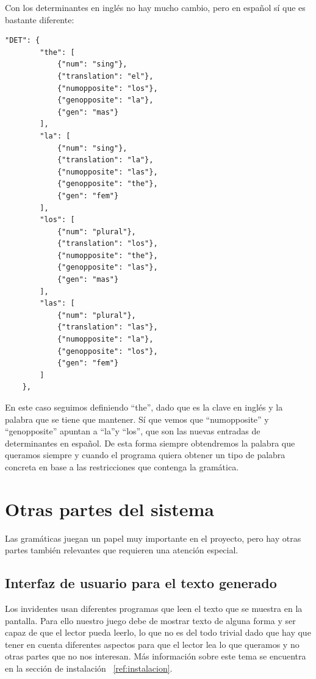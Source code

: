 Con los determinantes en inglés no hay mucho cambio, pero en español sí que es bastante diferente:

\begin{lstlisting}[style=json]
"DET": {
        "the": [
            {"num": "sing"},
            {"translation": "el"},
            {"numopposite": "los"},
            {"genopposite": "la"},
            {"gen": "mas"}
        ],
        "la": [
            {"num": "sing"},
            {"translation": "la"},
            {"numopposite": "las"},
            {"genopposite": "the"},
            {"gen": "fem"}
        ],
        "los": [
            {"num": "plural"},
            {"translation": "los"},
            {"numopposite": "the"},
            {"genopposite": "las"},
            {"gen": "mas"}
        ],
        "las": [
            {"num": "plural"},
            {"translation": "las"},
            {"numopposite": "la"},
            {"genopposite": "los"},
            {"gen": "fem"}
        ]
    },
\end{lstlisting}

En este caso seguimos definiendo ``the'', dado que es la clave en inglés y la palabra que se tiene que mantener. Sí que vemos que ``numopposite'' y ``genopposite'' apuntan a ``la''y ``los'', que son las nuevas entradas de determinantes en español. De esta forma siempre obtendremos la palabra que queramos siempre y cuando el programa quiera obtener un tipo de palabra concreta en base a las restricciones que contenga la gramática.

\section{Otras partes del sistema}

Las gramáticas juegan un papel muy importante en el proyecto, pero hay otras partes también relevantes que requieren una atención especial.

\subsection{Interfaz de usuario para el texto generado}

Los invidentes usan diferentes programas que leen el texto que se muestra en la pantalla. Para ello nuestro juego debe de mostrar texto de alguna forma y ser capaz de que el lector pueda leerlo, lo que no es del todo trivial dado que hay que tener en cuenta diferentes aspectos para que el lector lea lo que queramos y no otras partes que no nos interesan. Más información sobre este tema se encuentra en la sección de instalación ~\ref{ref:instalacion}.

